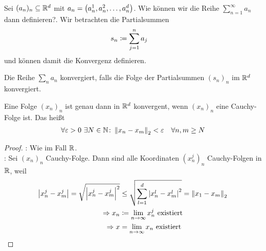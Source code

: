 
\begin{bemerkung}[Reihen im $\R^d$]
    \marginnote{[19. Dez]}
    Sei $(a_n)_n\subseteq\mathbb{R}^d$ mit $a_n = \left(a_n^1, a_n^2, \dots, a_n^d\right)$. Wie können wir die Reihe $\sum_{n=1}^{\infty} a_n$ dann definieren?. Wir betrachten die Partialsummen
    \begin{align*}
        s_n &\coloneqq \sum_{j=1}^{n} a_j
    \end{align*}
    und können damit die Konvergenz definieren.
\end{bemerkung}

\begin{definition}
    Die Reihe $\sum_{n} a_n$ konvergiert, falls die Folge der Partialsummen $(s_n)_n$ im $\R^d$ konvergiert.
\end{definition}

\begin{satz}
    \label{satz:cauchy-Rd}
    Eine Folge $(x_n)_n$ ist genau dann in $\R^d$ konvergent, wenn $(x_n)_n$ eine Cauchy-Folge ist. Das heißt
    \begin{align*}
        \forall\varepsilon > 0~\exists N\in\mathbb{N}\colon \left\lVert x_n-x_m\right\rVert_2 < \varepsilon\quad\forall n,m\geq N
    \end{align*}

    \begin{proof}
        \anf{$\impl$}: Wie im Fall $\mathbb{R}$.\\
        \anf{$\Leftarrow$}: Sei $(x_n)_n$ Cauchy-Folge. Dann sind alle Koordinaten $(x_n^j)_n$ Cauchy-Folgen in $\mathbb{R}$, weil
        \begin{align*}
            \left\lvert x_n^j-x_m^j\right\rvert = \sqrt {\left\lvert x_n^j-x_m^j\right\rvert^2} &\leq \sqrt {\sum_{l=1}^{d} \left\lvert x_n^l - x_m^l\right\rvert^2} = \left\lVert x_1-x_m\right\rVert_2\\
            \Rightarrow{} x_n &\coloneqq \lim_{n\rightarrow{}\infty} x_n^j\text{ existiert}\\
            \Rightarrow{} x &= \lim_{n\rightarrow{}\infty} x_n\text{ existiert}\qedhere
        \end{align*}
    \end{proof}
\end{satz}

